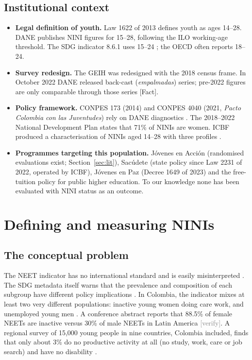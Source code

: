 \documentclass[11pt]{article}
\newcommand{\fact}{\textcolor{green!45!black}{\textsf{\footnotesize[Fact]}}}
\newcommand{\verify}{\textcolor{gray}{\textsf{\footnotesize[verify]}}}
\begin{document}
\subsection{Institutional context}

\begin{itemize}
\item \textbf{Legal definition of youth.} Law 1622 of 2013 defines youth as ages 14--28. DANE publishes NINI figures for 15--28, following the ILO working-age threshold. The SDG indicator 8.6.1 uses 15--24 \citep{sdg861}; the OECD often reports 18--24.
\item \textbf{Survey redesign.} The GEIH was redesigned with the 2018 census frame. In October 2022 DANE released back-cast (\textit{empalmadas}) series; pre-2022 figures are only comparable through those series \fact.
\item \textbf{Policy framework.} CONPES 173 (2014) and CONPES 4040 (2021, \textit{Pacto Colombia con las Juventudes}) rely on DANE diagnostics \citep{conpes173,conpes4040}. The 2018--2022 National Development Plan states that 71\% of NINIs are women. ICBF produced a characterisation of NINIs aged 14--28 with three profiles \citep{icbf}.
\item \textbf{Programmes targeting this population.} J\'ovenes en Acci\'on (randomised evaluations exist; Section~\ref{sec:lit}), Sac\'udete (state policy since Law 2231 of 2022, operated by ICBF), J\'ovenes en Paz (Decree 1649 of 2023) and the free-tuition policy for public higher education. To our knowledge none has been evaluated with NINI status as an outcome.
\end{itemize}

\section{Defining and measuring NINIs}\label{sec:measure}

\subsection{The conceptual problem}

The NEET indicator has no international standard and is easily misinterpreted \citep{elder2015}. The SDG metadata itself warns that the prevalence and composition of each subgroup have different policy implications \citep{sdg861}. In Colombia, the indicator mixes at least two very different populations: inactive young women doing care work, and unemployed young men \citep{ochoa2015,hernandez2016}. A conference abstract reports that 88.5\% of female NEETs are inactive versus 30\% of male NEETs in Latin America \verify. A regional survey of 15,000 young people in nine countries, Colombia included, finds that only about 3\% do no productive activity at all (no study, work, care or job search) and have no disability \citep{novella2018}.
\end{document}
